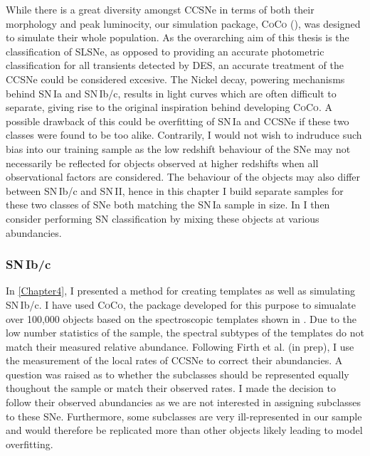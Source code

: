 While there is a great diversity amongst CCSNe in terms of both their morphology and peak luminocity, our simulation package, \textsc{CoCo} (), was designed to simulate their whole population. As the overarching aim of this thesis is the classification of SLSNe, as opposed to providing an accurate photometric classification for all transients detected by DES, an accurate treatment of the CCSNe could be considered excesive. The Nickel decay, powering mechanisms behind SN\,Ia and SN\,Ib/c, results in light curves which are often difficult to separate, giving rise to the original inspiration behind developing \textsc{CoCo}. A possible drawback of this could be overfitting of SN\,Ia and CCSNe if these two classes were found to be too alike. Contrarily, I would not wish to indruduce such bias into our training sample as the low redshift behaviour of the SNe may not necessarily be reflected for objects observed at higher redshifts when all observational factors are considered. The behaviour of the objects may also differ between SN\,Ib/c and SN\,II, hence in this chapter I build separate samples for these two classes of SNe both matching the SN\,Ia sample in size. In  I then consider performing SN classification by mixing these objects at various abundancies.

\subsubsection{SN\,Ib/c}
In \cref{Chapter4}, I presented a method for creating templates as well as simulating SN\,Ib/c. I have used \textsc{CoCo}, the package developed for this purpose to simualate over 100,000 objects based on the spectroscopic templates shown in . Due to the low number statistics of the sample, the spectral subtypes of the templates do not match their measured relative abundance. Following Firth et al. (in prep), I use the \citet{Li2011} measurement of the local rates of CCSNe to correct their abundancies. A question was raised as to whether the subclasses should be represented equally thoughout the sample or match their observed rates. I made the decision to follow their observed abundancies as we are not interested in assigning subclasses to these SNe. Furthermore, some subclasses are very ill-represented in our sample and would therefore be replicated more than other objects likely leading to model overfitting.

